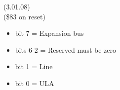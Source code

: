  (3.01.08)\\
(\$83 on reset)
\begin{itemize}
\item bit 7 = Expansion bus 
\item bits 6-2 = Reserved must be zero
\item bit 1 = Line
\item bit 0 = ULA
\end{itemize}

